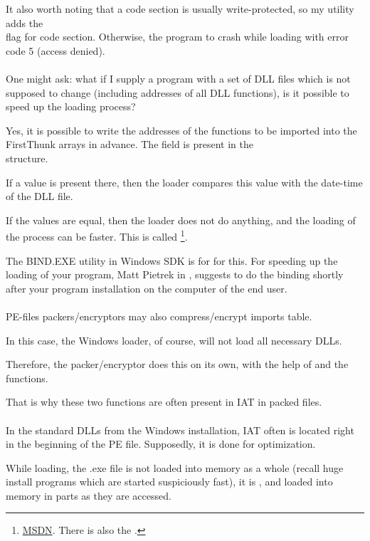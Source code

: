 It also worth noting that a code section is usually write-protected, so my utility adds the \\
flag for code section. Otherwise, the program to crash while loading with error code
5 (access denied). \\
\\
One might ask: what if I supply a program with a set of DLL files which is not supposed to change (including addresses of all DLL functions),
is it possible to speed up the loading process?

Yes, it is possible to write the addresses of the functions to be imported into the FirstThunk arrays in advance.
The  field is present in the \\
 structure.

If a value is present there, then the loader compares this value with the date-time of the DLL file.

If the values are equal, then the loader does not do anything, and the loading of the process can be faster.
This is called 
\footnote{\href{http://go.yurichev.com/17050}{MSDN}. There is also the .}.

The BIND.EXE utility in Windows SDK is for for this.
For speeding up the loading of your program, Matt Pietrek in \PietrekPEURL, suggests to do the binding shortly after your program
installation on the computer of the end user. \\
\\
PE-files packers/encryptors may also compress/encrypt imports table.

In this case, the Windows loader, of course, will not load all necessary DLLs.

Therefore, the packer/encryptor does this on its own, with the help of 
 and the  functions.

That is why these two functions are often present in \ac{IAT} in packed files.\\
\\
In the standard DLLs from the Windows installation, \ac{IAT} often is located right in the beginning of the PE file.
Supposedly, it is done for optimization.

While loading, the .exe file is not loaded into memory as a whole (recall huge install programs which are
started suspiciously fast), it is , and loaded into memory in parts as they are accessed.

